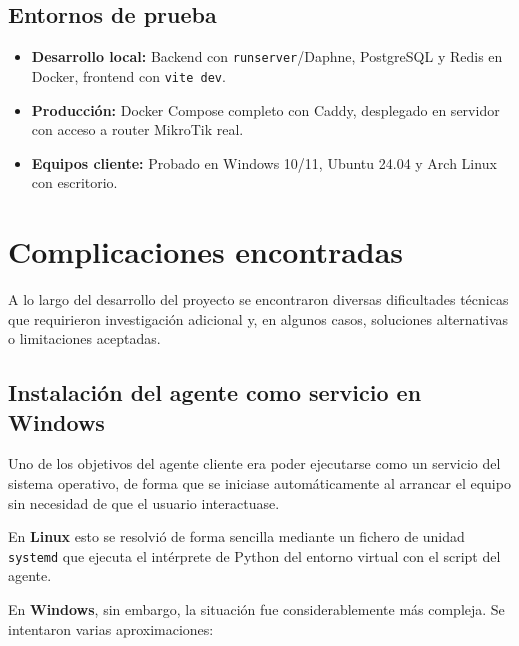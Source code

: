 \documentclass[12pt, a4paper, twoside]{article}
\begin{document}
\subsection{Entornos de prueba}

\begin{itemize}
  \item \textbf{Desarrollo local:} Backend con \texttt{runserver}/Daphne, PostgreSQL y Redis en Docker, frontend con \texttt{vite dev}.
  \item \textbf{Producción:} Docker Compose completo con Caddy, desplegado en servidor con acceso a router MikroTik real.
  \item \textbf{Equipos cliente:} Probado en Windows 10/11, Ubuntu 24.04 y Arch Linux con escritorio.
\end{itemize}

\section{Complicaciones encontradas}

A lo largo del desarrollo del proyecto se encontraron diversas dificultades técnicas que requirieron investigación adicional y, en algunos casos, soluciones alternativas o limitaciones aceptadas.

\subsection{Instalación del agente como servicio en Windows}

Uno de los objetivos del agente cliente era poder ejecutarse como un servicio del sistema operativo, de forma que se iniciase automáticamente al arrancar el equipo sin necesidad de que el usuario interactuase.

En \textbf{Linux} esto se resolvió de forma sencilla mediante un fichero de unidad \texttt{systemd} que ejecuta el intérprete de Python del entorno virtual con el script del agente.

En \textbf{Windows}, sin embargo, la situación fue considerablemente más compleja. Se intentaron varias aproximaciones:
\end{document}
